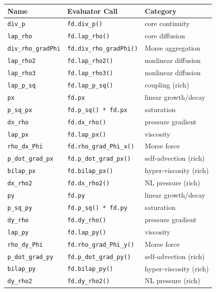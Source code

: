 \documentclass[11pt, letterpaper]{article}
\theoremstyle{definition}
\begin{document}
\begin{center}
\renewcommand{\arraystretch}{1.3}
\begin{longtable}{lll}
  \toprule
  \textbf{Name} & \textbf{Evaluator Call} & \textbf{Category} \\
  \midrule
  \endhead
  \texttt{div\_p}         & \texttt{fd.div\_p()}           & core continuity \\
  \texttt{lap\_rho}       & \texttt{fd.lap\_rho()}         & core diffusion \\
  \texttt{div\_rho\_gradPhi} & \texttt{fd.div\_rho\_gradPhi()} & Morse aggregation \\
  \texttt{lap\_rho2}      & \texttt{fd.lap\_rho2()}        & nonlinear diffusion \\
  \texttt{lap\_rho3}      & \texttt{fd.lap\_rho3()}        & nonlinear diffusion \\
  \texttt{lap\_p\_sq}     & \texttt{fd.lap\_p\_sq()}       & coupling (rich) \\
  \midrule
  \texttt{px}             & \texttt{fd.px}                 & linear growth/decay \\
  \texttt{p\_sq\_px}      & \texttt{fd.p\_sq() * fd.px}    & saturation \\
  \texttt{dx\_rho}        & \texttt{fd.dx\_rho()}          & pressure gradient \\
  \texttt{lap\_px}        & \texttt{fd.lap\_px()}          & viscosity \\
  \texttt{rho\_dx\_Phi}   & \texttt{fd.rho\_grad\_Phi\_x()}& Morse force \\
  \texttt{p\_dot\_grad\_px} & \texttt{fd.p\_dot\_grad\_px()} & self-advection (rich) \\
  \texttt{bilap\_px}      & \texttt{fd.bilap\_px()}        & hyper-viscosity (rich) \\
  \texttt{dx\_rho2}       & \texttt{fd.dx\_rho2()}         & NL pressure (rich) \\
  \midrule
  \texttt{py}             & \texttt{fd.py}                 & linear growth/decay \\
  \texttt{p\_sq\_py}      & \texttt{fd.p\_sq() * fd.py}    & saturation \\
  \texttt{dy\_rho}        & \texttt{fd.dy\_rho()}          & pressure gradient \\
  \texttt{lap\_py}        & \texttt{fd.lap\_py()}          & viscosity \\
  \texttt{rho\_dy\_Phi}   & \texttt{fd.rho\_grad\_Phi\_y()}& Morse force \\
  \texttt{p\_dot\_grad\_py} & \texttt{fd.p\_dot\_grad\_py()} & self-advection (rich) \\
  \texttt{bilap\_py}      & \texttt{fd.bilap\_py()}        & hyper-viscosity (rich) \\
  \texttt{dy\_rho2}       & \texttt{fd.dy\_rho2()}         & NL pressure (rich) \\
  \bottomrule
\end{longtable}
\end{center}
\end{document}

